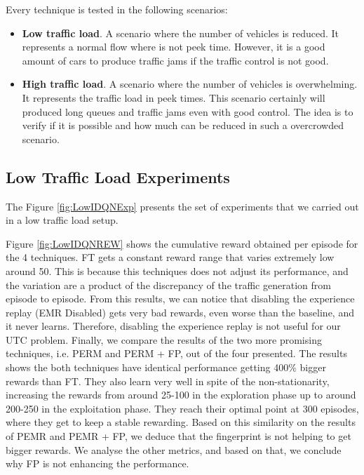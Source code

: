 \documentclass{llncs}
\begin{document}
Every technique is tested in the following scenarios:

\begin{itemize}
\item \textbf{Low traffic load}. A scenario where the number of vehicles is reduced. It represents a normal flow where is not peek time. However, it is a good amount of cars to produce traffic jams if the traffic control is not good.
\item \textbf{High traffic load}. A scenario where the number of vehicles is overwhelming. It represents the traffic load in peek times. This scenario certainly will produced long queues and traffic jams even with good control. The idea is to verify if it is possible and how much can be reduced in such a overcrowded scenario.
\end{itemize}


\subsection{Low Traffic Load Experiments}

The Figure \ref{fig:LowIDQNExp} presents the set of experiments that we carried out in a low traffic load setup.

Figure \ref{fig:LowIDQNREW} shows the cumulative reward obtained per episode for the 4 techniques. FT gets a constant reward range that varies extremely low around 50. This is because this techniques does not adjust its performance, and the variation are a product of the discrepancy of the traffic generation from episode to episode. From this results, we can notice that disabling the experience replay (EMR Disabled) gets very bad rewards, even worse than the baseline, and it never learns. Therefore, disabling the experience replay is not useful for our UTC problem. Finally, we compare the results of the two more promising techniques, i.e. PERM and PERM + FP, out of the four presented. The results shows the both techniques have identical performance getting 400$\%$ bigger rewards than FT. They also learn very well in spite of the non-stationarity, increasing the rewards from around 25-100 in the exploration phase up to around 200-250 in the exploitation phase. They reach their optimal point at 300 episodes, where they get to keep a stable rewarding. Based on this similarity on the results of PEMR and PEMR + FP, we deduce that the fingerprint is not helping to get bigger rewards. We analyse the other metrics, and based on that, we conclude why FP is not enhancing the performance.
\end{document}
